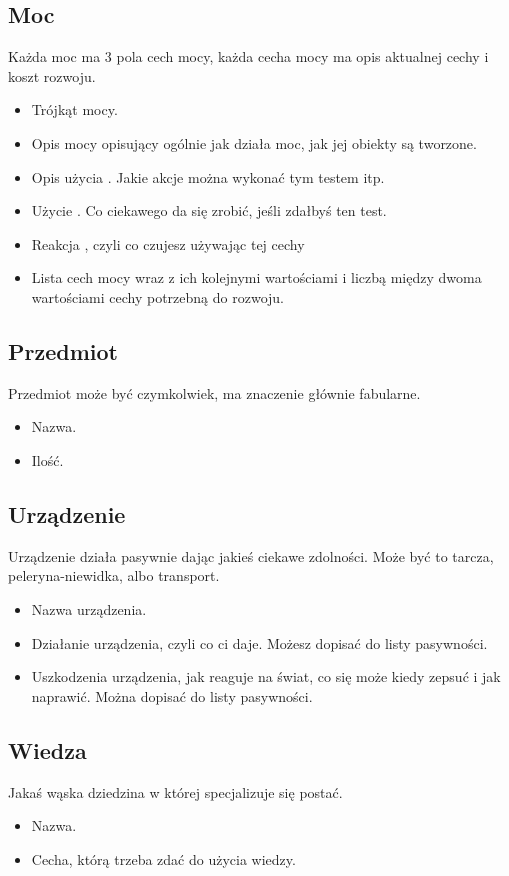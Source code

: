 \subsection{Moc}
Każda moc ma 3 pola cech mocy, każda cecha mocy ma opis aktualnej cechy i koszt rozwoju.
\begin{itemize} 
\item Trójkąt mocy.
\item Opis mocy opisujący ogólnie jak działa moc, jak jej obiekty są tworzone.
\item Opis użycia \absm{}. Jakie akcje można wykonać tym testem itp.
\item Użycie \abdm{}. Co ciekawego da się zrobić, jeśli zdałbyś ten test.
\item Reakcja \abrm{}, czyli co czujesz używając tej cechy
\item Lista cech mocy wraz z ich kolejnymi wartościami i liczbą \xpmcn{} między dwoma wartościami cechy potrzebną do rozwoju.
\end{itemize}

\subsection{Przedmiot}
Przedmiot może być czymkolwiek, ma znaczenie głównie fabularne.
\begin{itemize}
 \item Nazwa.
 \item Ilość.
\end{itemize}

\subsection{Urządzenie}
Urządzenie działa pasywnie dając jakieś ciekawe zdolności.
Może być to tarcza, peleryna-niewidka, albo transport.
\begin{itemize}
\item Nazwa urządzenia.
\item Działanie urządzenia, czyli co ci daje. Możesz dopisać do listy pasywności.
\item Uszkodzenia urządzenia, jak reaguje na świat, co się może kiedy zepsuć i jak naprawić. Można dopisać do listy pasywności.
\end{itemize}

\subsection{Wiedza}
Jakaś wąska dziedzina w której specjalizuje się postać.
\begin{itemize}
 \item Nazwa.
 \item Cecha, którą trzeba zdać do użycia wiedzy.
\end{itemize}

